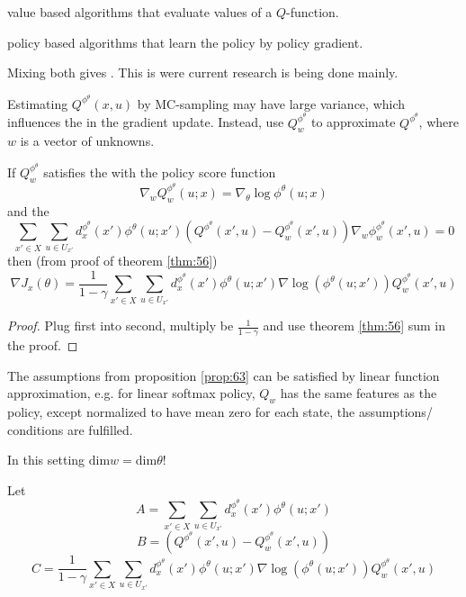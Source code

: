  value based algorithms that evaluate values of a \(Q\)-function. 

 policy based algorithms that learn the policy by policy gradient.

Mixing both gives . This is were current research is being done mainly.

Estimating \(Q^{\phi^\theta}(x,u)\) by MC-sampling may have large variance, 
which influences the  in the gradient update.
Instead, use \(Q_w^{\phi^\theta}\) to approximate \(Q^{\phi^\theta}\), where \(w\) is a vector of unknowns.


\begin{proposition}\label{prop:63}
    If \(Q_w^{\phi^\theta}\) satisfies the  with 
    the policy score function 
    \[\nabla_w Q_w^{\phi^\theta}(u;x)=\nabla_\theta \log \phi^\theta(u;x)\]
    and the 
    \[\sum_{x'\in X}\sum_{u\in U_{x'}}d_x^{\phi^\theta}(x')\phi^\theta(u;x')\left(Q^{\phi^\theta}(x',u)-Q_w^{\phi^\theta}(x',u)\right)\nabla_w\phi_w^{\phi^\theta}(x',u)=0\]
    then (from proof of theorem \ref{thm:56}) 
    \[\nabla J_x(\theta)=\frac{1}{1-\gamma}\sum_{x'\in X}\sum_{u\in U_{x'}}d_x^{\phi^\theta}(x')\phi^\theta(u;x')\nabla\log (\phi^\theta(u;x'))Q_w^{\phi^\theta}(x',u)\]
\end{proposition}

\begin{proof}
    Plug first into second, multiply be \(\frac{1}{1-\gamma}\) and use theorem \ref{thm:56} sum in the proof.
\end{proof}

\begin{remark}
    The assumptions from proposition \ref{prop:63} can be satisfied by 
    linear function approximation, e.g. for linear softmax policy, \(Q_w\) has the same 
    features as the policy, except normalized to have mean zero for each state, the assumptions/ conditions 
    are fulfilled.

    In this setting $\text{dim} w=\text{dim} \theta$! 

\end{remark}

Let \[A=\sum_{x'\in X}\sum_{u\in U_{x'}}d_x^{\phi^\theta}(x')\phi^\theta(u;x')\]
\[B=\left(Q^{\phi^\theta}(x',u)-Q_w^{\phi^\theta}(x',u)\right)\]
\[C=\frac{1}{1-\gamma}\sum_{x'\in X}\sum_{u\in U_{x'}}d_x^{\phi^\theta}(x')\phi^\theta(u;x')\nabla\log (\phi^\theta(u;x'))Q_w^{\phi^\theta}(x',u)\]

